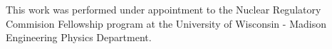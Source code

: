 \documentclass{mc2013}
\begin{document}
This work was performed under appointment to the Nuclear Regulatory
Commision Fellowship program at the University of Wisconsin - Madison
Engineering Physics Department.

\setlength{\baselineskip}{12pt}



\end{document}
